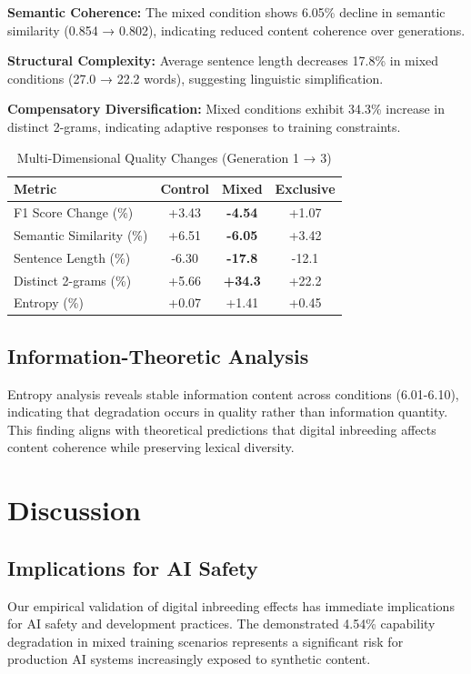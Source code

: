 \documentclass[letterpaper]{article}
\begin{document}
\textbf{Semantic Coherence:} The mixed condition shows 6.05\% decline in semantic similarity (0.854 → 0.802), indicating reduced content coherence over generations.

\textbf{Structural Complexity:} Average sentence length decreases 17.8\% in mixed conditions (27.0 → 22.2 words), suggesting linguistic simplification.

\textbf{Compensatory Diversification:} Mixed conditions exhibit 34.3\% increase in distinct 2-grams, indicating adaptive responses to training constraints.

\begin{table}[h]
\centering
\caption{Multi-Dimensional Quality Changes (Generation 1 → 3)}
\label{tab:multidim_results}
\begin{tabular}{lccc}
\toprule
Metric & Control & Mixed & Exclusive \\
\midrule
F1 Score Change (\%) & +3.43 & \textbf{-4.54} & +1.07 \\
Semantic Similarity (\%) & +6.51 & \textbf{-6.05} & +3.42 \\
Sentence Length (\%) & -6.30 & \textbf{-17.8} & -12.1 \\
Distinct 2-grams (\%) & +5.66 & \textbf{+34.3} & +22.2 \\
Entropy (\%) & +0.07 & +1.41 & +0.45 \\
\bottomrule
\end{tabular}
\end{table}

\subsection{Information-Theoretic Analysis}

Entropy analysis reveals stable information content across conditions (6.01-6.10), indicating that degradation occurs in quality rather than information quantity. This finding aligns with theoretical predictions that digital inbreeding affects content coherence while preserving lexical diversity.

\section{Discussion}

\subsection{Implications for AI Safety}

Our empirical validation of digital inbreeding effects has immediate implications for AI safety and development practices. The demonstrated 4.54\% capability degradation in mixed training scenarios represents a significant risk for production AI systems increasingly exposed to synthetic content.
\end{document}
